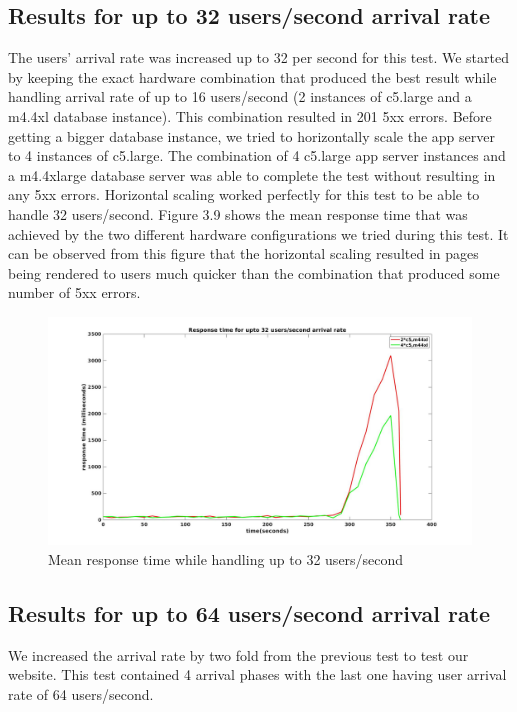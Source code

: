 \subsection{Results for up to 32 users/second arrival rate}
 The users' arrival rate was increased up to 32 per second for this test. We started by keeping the exact hardware combination that produced the best result while handling arrival rate of up to 16 users/second (2 instances of c5.large and a m4.4xl database instance). This combination resulted in 201 5xx errors. Before getting a bigger database instance, we tried to horizontally scale the app server to 4 instances of c5.large. The combination of 4 c5.large app server instances and a m4.4xlarge database server was able to complete the test without resulting in any 5xx errors. Horizontal scaling worked perfectly for this test to be able to handle 32 users/second.
 Figure 3.9 shows the mean response time that was achieved by the two different hardware configurations we tried during this test. It can be observed from this figure that the horizontal scaling resulted in pages being rendered to users much quicker than the combination that produced some number of 5xx errors. 

\begin{figure}[h]
	\centering
	\includegraphics[width=1\textwidth, height=0.5\textheight]{images/scale32.jpg}
	\caption{Mean response time while handling up to 32 users/second}\label{fig:sqlopt}
\end{figure}


\subsection{Results for up to 64 users/second arrival rate}
We increased the arrival rate by two fold from the previous test to test our website. This test contained 4 arrival phases with the last one having user arrival rate of 64 users/second.  

